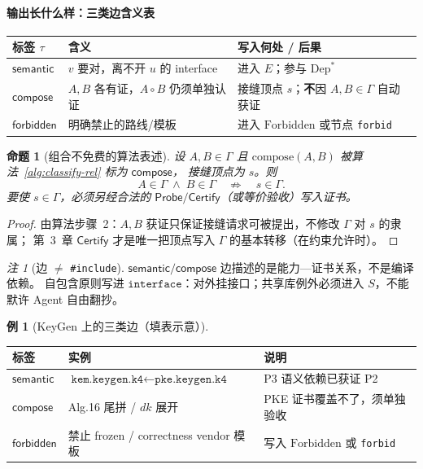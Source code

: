 \documentclass[UTF8,a4paper,11pt]{ctexart}
\theoremstyle{definition}
\newtheorem{example}{例}[section]
\theoremstyle{plain}
\newtheorem{proposition}{命题}[section]
\theoremstyle{remark}
\newtheorem{remark}{注}[section]
\numberwithin{figure}{section}
\numberwithin{table}{section}
\begin{document}
\paragraph{输出长什么样：三类边含义表}
\begin{center}
\begin{tabular}{@{}L{2.8cm}L{5.2cm}L{5.6cm}@{}}
  \toprule
  标签 $\tau$ & 含义 & 写入何处 / 后果 \\
  \midrule
  $\mathsf{semantic}$ &
  $v$ 要对，离不开 $u$ 的 interface &
  进入 $E$；参与 $\mathrm{Dep}^*$ \\
  $\mathsf{compose}$ &
  $A,B$ 各有证，$A\!\circ\!B$ 仍须单独认证 &
  接缝顶点 $s$；\textbf{不}因 $A,B\in\Gamma$ 自动获证 \\
  $\mathsf{forbidden}$ &
  明确禁止的路线/模板 &
  进入 $\mathrm{Forbidden}$ 或节点 \texttt{forbid} \\
  \bottomrule
\end{tabular}
\end{center}

\begin{proposition}[组合不免费的算法表述]
\label{prop:compose-not-free}
设 $A,B\in\Gamma$ 且 $\mathrm{compose}(A,B)$ 被算法~\ref{alg:classify-rel} 标为 $\mathsf{compose}$，
接缝顶点为 $s$。则
\[
A\in\Gamma \;\land\; B\in\Gamma \quad\not\Rightarrow\quad s\in\Gamma.
\]
要使 $s\in\Gamma$，必须另经合法的 $\mathsf{Probe}/\mathsf{Certify}$（或等价验收）写入证书。
\end{proposition}
\begin{proof}
由算法步骤~2：$A,B$ 获证只保证接缝请求可被提出，不修改 $\Gamma$ 对 $s$ 的隶属；
第~3~章 $\mathsf{Certify}$ 才是唯一把顶点写入 $\Gamma$ 的基本转移（在约束允许时）。
\end{proof}

\begin{remark}[边 $\neq$ \texttt{\#include}]
$\mathsf{semantic}/\mathsf{compose}$ 边描述的是能力—证书关系，不是编译依赖。
自包含原则写进 $\texttt{interface}$：对外挂接口；共享库例外必须进入 $S$，不能默许 Agent 自由翻抄。
\end{remark}

\begin{example}[KeyGen 上的三类边（填表示意）]
\begin{center}
\begin{tabular}{@{}L{2.2cm}L{6.0cm}L{5.4cm}@{}}
  \toprule
  标签 & 实例 & 说明 \\
  \midrule
  $\mathsf{semantic}$ &
  $\texttt{kem.keygen.k4}\leftarrow\texttt{pke.keygen.k4}$ &
  P3 语义依赖已获证 P2 \\
  $\mathsf{compose}$ &
  Alg.16 尾拼 / $\mathit{dk}$ 展开 &
  PKE 证书覆盖不了，须单独验收 \\
  $\mathsf{forbidden}$ &
  禁止 frozen / correctness vendor 模板 &
  写入 $\mathrm{Forbidden}$ 或 \texttt{forbid} \\
  \bottomrule
\end{tabular}
\end{center}
\end{example}
\end{document}

